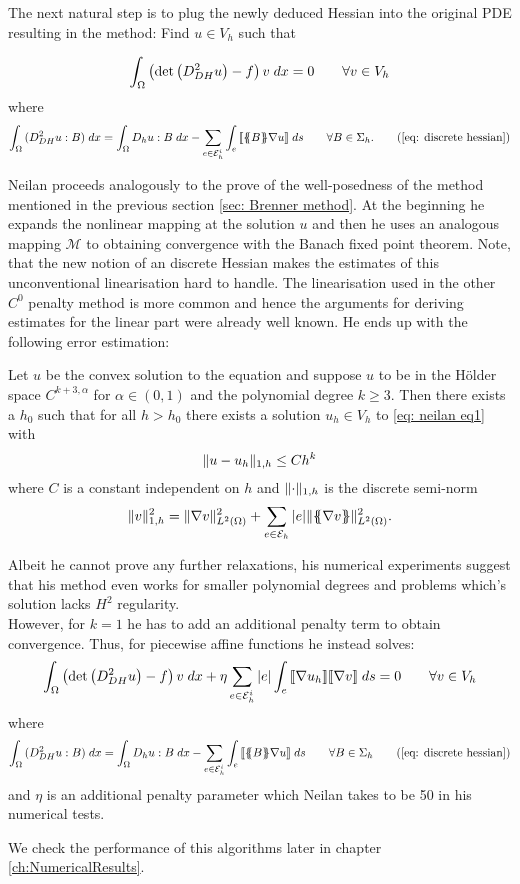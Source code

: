 The next natural step is to plug the newly deduced Hessian into the original \MA PDE resulting in the method: Find $u \in V_h$ such that

\begin{align}
		\int_{\Omega} {{ \left(\det{\left(D_{DH}^2 u\right)} - f \right) v}\;dx} = 0 \qquad \forall v \in V_h \label{eq: neilan eq1}
\end{align}
where
	\begin{align}
		\myIntX  \Omega { (D_{DH}^2 u : B) }
		= \myIntX  \Omega { D_h u: B}
			 -\sum_{ e \in \edgesi} \myIntS e {  \jump {\average B \nabla u }}\qquad \forall B \in \Sigma_h. \tag{\ref{eq: discrete hessian}}
	\end{align}

Neilan proceeds analogously to the prove of the well-posedness of the method mentioned in the previous section \ref{sec: Brenner method}. At the beginning he expands the nonlinear mapping at the solution $u$ and then he uses an analogous mapping $\mathcal M$ to obtaining convergence with the Banach fixed point theorem. Note, that the new notion of an discrete Hessian makes the estimates of this unconventional linearisation hard to handle. The linearisation used in the other $C^0$ penalty method is more common and hence the arguments for deriving estimates for the linear part were already well known.
He ends up with the following error estimation:
\begin{theorem}
	Let $u$ be the convex solution to the \MA equation and suppose $u$ to be in the Hölder space $C^{k+3,\alpha}$ for $\alpha \in (0,1)$ and the polynomial degree $k\geq3$. Then there exists a $h_0$ such that for all $h > h_0$ there exists a solution $u_h \in V_h$ to \eqref{eq: neilan eq1} with
	\[
		\lVert u-u_h \rVert_{1,h} \leq C h^k
	\]
	where $C$ is a constant independent on $h$ and $\lVert \cdot  \rVert_{1,h}$ is the discrete semi-norm 
	\[
		\lVert v \rVert_{1,h}^2 = \lVert \nabla v  \rVert^2_{L^2(\Omega)} + \sum_{e \in \mathcal{E}_h} |e| \lVert \{\!\!\{ \nabla v \}\!\!\} \rVert^2_{L^2(\Omega)}.
	\]
\end{theorem}

Albeit he cannot prove any further relaxations, his numerical experiments suggest that his method even works for smaller polynomial degrees and problems which's solution lacks $H^2$ regularity. 
\\However, for $k=1$ he has to add an additional penalty term to obtain convergence. Thus, for piecewise affine functions he instead solves:
\begin{align}
		\int_{\Omega} {{ \left(\det{\left(D_{DH}^2 u\right)} - f \right) v}\;dx} 
			+ \eta \sum_{e \in \mathcal{E}_h^i} |e| \int_{e} {{ \llbracket  \nabla u_h \rrbracket \llbracket \nabla v \rrbracket}\;ds}
		= 0 \qquad \forall v \in V_h \label{eq: neilan eq1 + jump}
\end{align}
where
	\begin{align*}
		\myIntX  \Omega { (D_{DH}^2 u : B) }
		= \myIntX  \Omega { D_h u: B}
			 -\sum_{ e \in \edgesi} \myIntS e {  \jump {\average B \nabla u }}\qquad \forall B \in \Sigma_h \tag{\ref{eq: discrete hessian}}
	\end{align*}
and $\eta$ is an additional penalty parameter which Neilan takes to be 50 in his numerical tests.

We check the performance of this algorithms later in chapter \ref{ch:NumericalResults}.